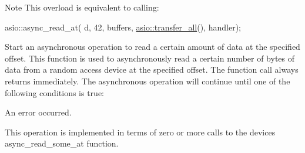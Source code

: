 \begin{DoxyNote}{Note}
This overload is equivalent to calling\+: 
\begin{DoxyCode}
asio::async\_read\_at(
   d, 42, buffers,
   \hyperlink{group__completion__condition_ga4a82e92df79aa8401a8bc2117d4cf900}{asio::transfer\_all}(),
   handler); 
\end{DoxyCode}

\end{DoxyNote}
Start an asynchronous operation to read a certain amount of data at the specified offset. This function is used to asynchronously read a certain number of bytes of data from a random access device at the specified offset. The function call always returns immediately. The asynchronous operation will continue until one of the following conditions is true\+:

\begin{DoxyItemize}
\item An error occurred.\end{DoxyItemize}
This operation is implemented in terms of zero or more calls to the device\textquotesingle{}s async\+\_\+read\+\_\+some\+\_\+at function.


